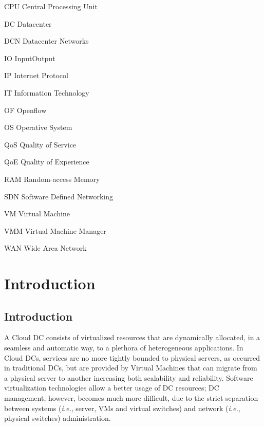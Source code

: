 \documentclass[12pt,english,oneside]{book}
\newenvironment{lyxlist}[1]
   {\begin{list}{}
     {\settowidth{\labelwidth}{#1}
      \setlength{\leftmargin}{\labelwidth}
      \addtolength{\leftmargin}{\labelsep}
      \renewcommand{\makelabel}[1]{##1\hfil}}}
   {\end{list}}
\begin{document}


\begin{lyxlist}{00.00.0000}
\begin{singlespace}
\item [CPU]Central Processing Unit
\item [DC]Datacenter
\item [DCN]Datacenter Networks
\item [IO]Input\/Output
\item [IP]Internet Protocol 
\item [IT]Information Technology
\item [OF]Openflow
\item [OS]Operative System
\item [QoS] Quality of Service
\item [QoE] Quality of Experience
\item [RAM]Random-access Memory
\item [SDN]Software Defined Networking
\item [VM]Virtual Machine
\item [VMM]Virtual Machine Manager
\item [WAN] Wide Area Network
\end{singlespace}
\end{lyxlist}


\listoffigures


\listoftables


\setcounter{page}{0}



\chapter{Introduction\label{cha:introduction}}

\section{Introduction}
\hspace{0.6cm}

A Cloud DC consists of virtualized resources that are dynamically allocated, in a seamless and automatic way, to a plethora of heterogeneous applications.
In Cloud DCs, services are no more tightly bounded to physical servers, as occurred in traditional DCs, but are provided by Virtual Machines that can migrate from a physical server to another increasing both scalability and reliability.
Software virtualization technologies allow a better usage of DC resources; DC management, however, becomes much more difficult, due to the strict separation between systems (\textit{i.e.}, server, VMs and virtual switches) and network (\textit{i.e.}, physical switches) administration.
\end{document}
